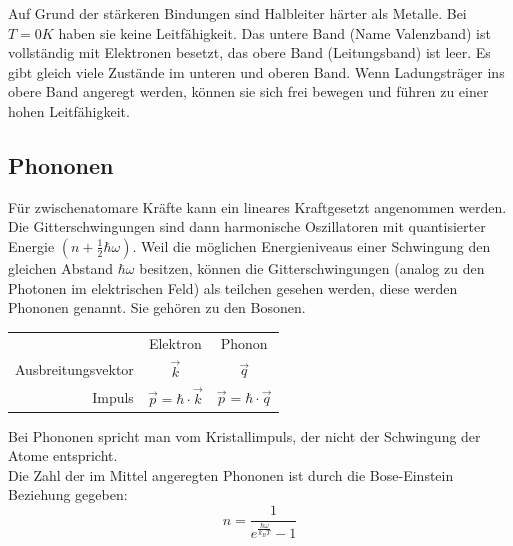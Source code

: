 Auf Grund der st\"arkeren Bindungen sind Halbleiter h\"arter als Metalle. Bei $T=0K$ haben sie keine Leitf\"ahigkeit.
Das untere Band (Name Valenzband) ist vollständig mit Elektronen besetzt, das obere Band (Leitungsband) ist leer.
Es gibt gleich viele Zustände im unteren und oberen Band. Wenn Ladungsträger ins obere Band angeregt werden, können
sie sich frei bewegen und führen zu einer hohen Leitfähigkeit.

\subsection{Phononen }\label{k2:phononen}
F\"ur zwischenatomare Kr\"afte kann ein lineares Kraftgesetzt angenommen werden. Die Gitterschwingungen sind dann harmonische Oszillatoren mit quantisierter Energie $(n+\frac{1}{2}\hbar \omega)$.
Weil die m\"oglichen Energieniveaus einer Schwingung den gleichen Abstand $\hbar \omega$ besitzen, k\"onnen die Gitterschwingungen (analog zu den Photonen im elektrischen Feld) als teilchen gesehen werden, diese werden Phononen genannt. Sie geh\"oren zu den Bosonen.

\begin{table}[H]
    \centering
    \begin{tabular}{rcc}
         & Elektron & Phonon \\
         Ausbreitungsvektor & $\vec{k}$ & $\vec{q}$ \\
         Impuls & $\vec{p} = \hbar \cdot \vec{k}$ & $\vec{p} = \hbar \cdot \vec{q}$ 
    \end{tabular}
\end{table}

Bei Phononen spricht man vom Kristallimpuls, der nicht der Schwingung der Atome entspricht.\\
Die Zahl der im Mittel angeregten Phononen ist durch die Bose-Einstein Beziehung gegeben:
\begin{equation}
    n = \frac{1}{e^{\frac{\hbar\omega}{k_B T}}-1}
\end{equation}